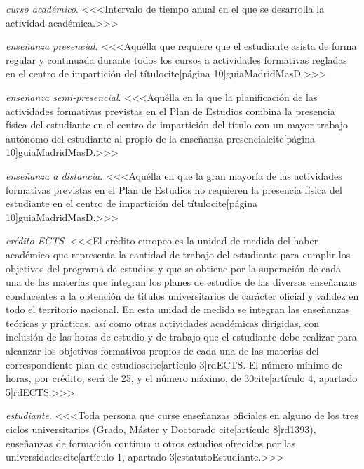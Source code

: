     \item \emph{curso académico}. <<<Intervalo de tiempo anual en el que se desarrolla la actividad académica.>>>

    \item \emph{enseñanza presencial}. <<<Aquélla que requiere que el estudiante asista de forma regular y continuada durante todos los cursos a actividades formativas regladas en el centro de impartición del títulocite[página 10]{guiaMadridMasD}.>>>

    \item \emph{enseñanza semi-presencial}. <<<Aquélla en la que la planificación de las actividades formativas previstas en el Plan de Estudios combina la presencia física del estudiante en el centro de impartición del título con un mayor trabajo autónomo del estudiante al propio de la enseñanza presencialcite[página 10]{guiaMadridMasD}.>>>

    \item \emph{enseñanza a distancia}. <<<Aquélla en que la gran mayoría de las actividades formativas previstas en el Plan de Estudios no requieren la presencia física del estudiante en el centro de impartición del títulocite[página 10]{guiaMadridMasD}.>>>

    \item \emph{crédito ECTS}. <<<El crédito europeo es la unidad de medida del haber académico que representa la cantidad de trabajo del estudiante para cumplir los objetivos del programa de estudios y que se obtiene por la superación de cada una de las materias que integran los planes de estudios de las diversas enseñanzas conducentes a la obtención de títulos universitarios de carácter oficial y validez en todo el territorio nacional. En esta unidad de medida se integran las enseñanzas teóricas y prácticas, así como otras actividades académicas dirigidas, con inclusión de las horas de estudio y de trabajo que el estudiante debe realizar para alcanzar los objetivos formativos propios de cada una de las materias del correspondiente plan de estudioscite[artículo 3]{rdECTS}. El número mínimo de horas, por crédito, será de 25, y el número máximo, de 30cite[artículo 4, apartado 5]{rdECTS}.>>>

    \item \emph{estudiante}. <<<Toda  persona  que  curse  enseñanzas  oficiales en alguno de los tres ciclos universitarios (Grado, Máster y Doctorado cite[artículo 8]{rd1393}), enseñanzas de formación continua u otros estudios ofrecidos por las universidadescite[artículo 1, apartado 3]{estatutoEstudiante}.>>>

